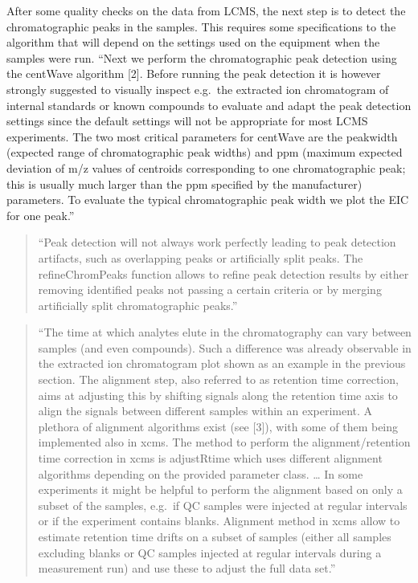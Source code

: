 \documentclass[]{tufte-book}
\begin{document}
After some quality checks on the data from LCMS, the next step is to
detect the chromatographic peaks in the samples. This requires some
specifications to the algorithm that will depend on the settings used
on the equipment when the samples were run.
``Next we perform the chromatographic peak detection using the centWave algorithm {[}2{]}. Before running the peak detection it is however strongly suggested to visually inspect e.g.~the extracted ion chromatogram of internal standards or known compounds to evaluate and adapt the peak detection settings since the default settings will not be appropriate for most LCMS experiments. The two most critical parameters for centWave are the peakwidth (expected range of chromatographic peak widths) and ppm (maximum expected deviation of m/z values of centroids corresponding to one chromatographic peak; this is usually much larger than the ppm specified by the manufacturer) parameters. To evaluate the typical chromatographic peak width we plot the EIC for one peak.''
\citep{smith2013lc}

\begin{quote}
``Peak detection will not always work perfectly leading to peak detection artifacts, such as overlapping peaks or artificially split peaks. The refineChromPeaks function allows to refine peak detection results by either removing identified peaks not passing a certain criteria or by merging artificially split chromatographic peaks.'' \citep{smith2013lc}
\end{quote}

\begin{quote}
``The time at which analytes elute in the chromatography can vary between samples (and even compounds). Such a difference was already observable in the extracted ion chromatogram plot shown as an example in the previous section. The alignment step, also referred to as retention time correction, aims at adjusting this by shifting signals along the retention time axis to align the signals between different samples within an experiment. A plethora of alignment algorithms exist (see {[}3{]}), with some of them being implemented also in xcms. The method to perform the alignment/retention time correction in xcms is adjustRtime which uses different alignment algorithms depending on the provided parameter class. \ldots{} In some experiments it might be helpful to perform the alignment based on only a subset of the samples, e.g.~if QC samples were injected at regular intervals or if the experiment contains blanks. Alignment method in xcms allow to estimate retention time drifts on a subset of samples (either all samples excluding blanks or QC samples injected at regular intervals during a measurement run) and use these to adjust the full data set.'' \citep{smith2013lc}
\end{quote}
\end{document}
